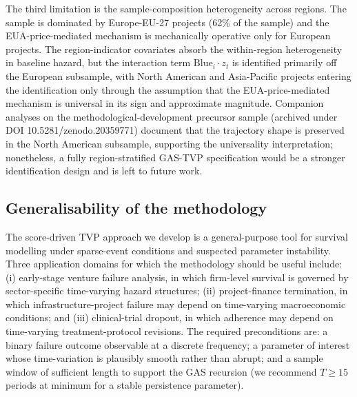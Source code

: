 \documentclass[12pt,a4paper]{article}
\theoremstyle{plain}
\theoremstyle{definition}
\begin{document}
The third limitation is the sample-composition heterogeneity across regions. The sample is dominated by Europe-EU-27 projects (62\% of the sample) and the EUA-price-mediated mechanism is mechanically operative only for European projects. The region-indicator covariates absorb the within-region heterogeneity in baseline hazard, but the interaction term $\text{Blue}_i \cdot z_t$ is identified primarily off the European subsample, with North American and Asia-Pacific projects entering the identification only through the assumption that the EUA-price-mediated mechanism is universal in its sign and approximate magnitude. Companion analyses on the methodological-development precursor sample (archived under DOI 10.5281/zenodo.20359771) document that the trajectory shape is preserved in the North American subsample, supporting the universality interpretation; nonetheless, a fully region-stratified GAS-TVP specification would be a stronger identification design and is left to future work.

\subsection{Generalisability of the methodology}

The score-driven TVP approach we develop is a general-purpose tool for survival modelling under sparse-event conditions and suspected parameter instability. Three application domains for which the methodology should be useful include: (i) early-stage venture failure analysis, in which firm-level survival is governed by sector-specific time-varying hazard structures; (ii) project-finance termination, in which infrastructure-project failure may depend on time-varying macroeconomic conditions; and (iii) clinical-trial dropout, in which adherence may depend on time-varying treatment-protocol revisions. The required preconditions are: a binary failure outcome observable at a discrete frequency; a parameter of interest whose time-variation is plausibly smooth rather than abrupt; and a sample window of sufficient length to support the GAS recursion (we recommend $T \geq 15$ periods at minimum for a stable persistence parameter).
\end{document}
